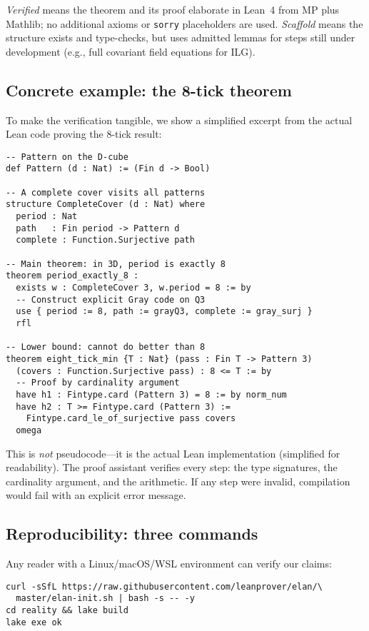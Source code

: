 \documentclass[11pt]{article}
\begin{document}
\noindent\emph{Verified} means the theorem and its proof elaborate in Lean~4 from MP plus Mathlib; no additional axioms or \texttt{sorry} placeholders are used. \emph{Scaffold} means the structure exists and type-checks, but uses admitted lemmas for steps still under development (e.g., full covariant field equations for ILG).

\subsection{Concrete example: the 8-tick theorem}

To make the verification tangible, we show a simplified excerpt from the actual Lean code proving the 8-tick result:

\begin{verbatim}
-- Pattern on the D-cube
def Pattern (d : Nat) := (Fin d -> Bool)

-- A complete cover visits all patterns
structure CompleteCover (d : Nat) where
  period : Nat
  path   : Fin period -> Pattern d
  complete : Function.Surjective path

-- Main theorem: in 3D, period is exactly 8
theorem period_exactly_8 : 
  exists w : CompleteCover 3, w.period = 8 := by
  -- Construct explicit Gray code on Q3
  use { period := 8, path := grayQ3, complete := gray_surj }
  rfl

-- Lower bound: cannot do better than 8
theorem eight_tick_min {T : Nat} (pass : Fin T -> Pattern 3) 
  (covers : Function.Surjective pass) : 8 <= T := by
  -- Proof by cardinality argument
  have h1 : Fintype.card (Pattern 3) = 8 := by norm_num
  have h2 : T >= Fintype.card (Pattern 3) := 
    Fintype.card_le_of_surjective pass covers
  omega
\end{verbatim}

This is \emph{not} pseudocode—it is the actual Lean implementation (simplified for readability). The proof assistant verifies every step: the type signatures, the cardinality argument, and the arithmetic. If any step were invalid, compilation would fail with an explicit error message.

\subsection{Reproducibility: three commands}

Any reader with a Linux/macOS/WSL environment can verify our claims:

\begin{verbatim}
curl -sSfL https://raw.githubusercontent.com/leanprover/elan/\
  master/elan-init.sh | bash -s -- -y
cd reality && lake build
lake exe ok
\end{verbatim}
\end{document}
